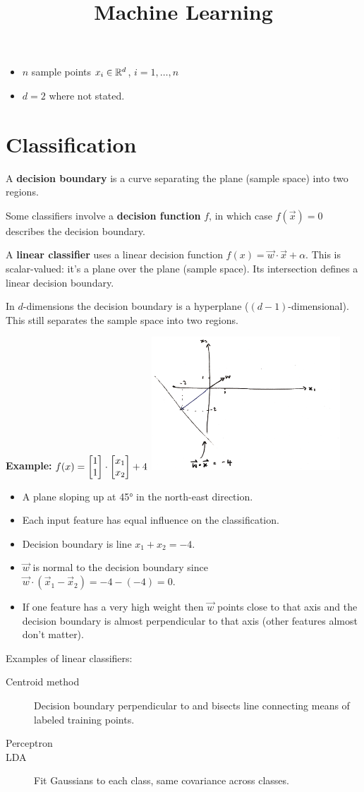 \documentclass[12pt]{article}
\title{Machine Learning}
\begin{document}
\maketitle

\begin{itemize}
\item $n$ sample points $x_i \in \mathbb{R}^d$, $i = 1, \ldots, n$
\item $d = 2$ where not stated.
\end{itemize}

\section*{Classification}

A \textbf{decision boundary} is a curve separating the plane (sample space)
into two regions.

Some classifiers involve a \textbf{decision function} $f$, in which case
$f(\vec x) = 0$ describes the decision boundary.

A \textbf{linear classifier} uses a linear decision function
$f(x) = \vec w \cdot \vec x + \alpha$. This is scalar-valued: it's a plane over
the plane (sample space). Its intersection defines a linear decision boundary.

In $d$-dimensions the decision boundary is a hyperplane
($(d-1)$-dimensional). This still separates the sample space into two regions.

\textbf{Example:} $f(x) = \begin{bmatrix}1\\1\end{bmatrix} \cdot \begin{bmatrix}x_1\\x_2\end{bmatrix} + 4$
\includegraphics[width=200pt]{img/machine-learning-linear-decision-boundary.png}
\begin{itemize}
\item A plane sloping up at 45° in the north-east direction.
\item Each input feature has equal influence on the classification.
\item Decision boundary is line $x_1 + x_2 = -4$.
\item $\vec w$ is normal to the decision boundary since $\vec w \cdot (\vec x_1 - \vec x_2) = -4 - (-4) = 0$.
\item If one feature has a very high weight then $\vec w$ points close to that
  axis and the decision boundary is almost perpendicular to that axis (other
  features almost don't matter).
\end{itemize}

Examples of linear classifiers:
\begin{description}
\item[Centroid method] Decision boundary perpendicular to and bisects line
  connecting means of labeled training points.
\item[Perceptron]
\item[LDA] Fit Gaussians to each class, same covariance across classes.
\end{description}
\end{document}
